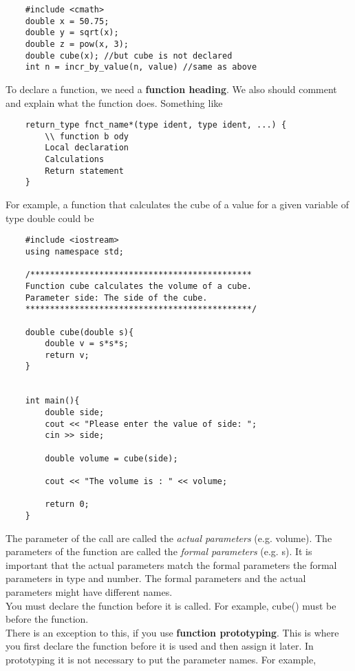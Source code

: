 \documentclass[]{article}
\begin{document}
\begin{lstlisting}
	#include <cmath>
	double x = 50.75;
	double y = sqrt(x);
	double z = pow(x, 3);
	double cube(x); //but cube is not declared
	int n = incr_by_value(n, value) //same as above
\end{lstlisting}\bigbreak


To declare a function, we need a \textbf{function heading}. We also should comment and explain what the function does. Something like

\begin{lstlisting}
	return_type fnct_name*(type ident, type ident, ...) {
		\\ function b ody
		Local declaration 
		Calculations 
		Return statement
	}
\end{lstlisting}\bigbreak

For example, a function that calculates the cube of a value for a given variable of type double could be

\begin{lstlisting}
	#include <iostream>
	using namespace std;
	
	/*********************************************
	Function cube calculates the volume of a cube.
	Parameter side: The side of the cube.
	**********************************************/
	
	double cube(double s){
		double v = s*s*s;
		return v;
	}


	int main(){
		double side;
		cout << "Please enter the value of side: ";
		cin >> side;
		
		double volume = cube(side);
		
		cout << "The volume is : " << volume;
		
		return 0;
	}
\end{lstlisting}\bigbreak


The parameter of the call are called the \textit{actual parameters} (e.g. volume). The parameters of the function are called the \textit{formal parameters} (e.g. s). It is important that the actual parameters match the formal parameters the formal parameters in type and number.
The formal parameters and the actual parameters might have different names.\\


You must declare the function before it is called. For example, cube() must be before the function. \\

There is an exception to this, if you use \textbf{function prototyping}. This is where you first declare the function before it is used and then assign it later. In prototyping it is not necessary to put the parameter names. For example, 
\end{document}
